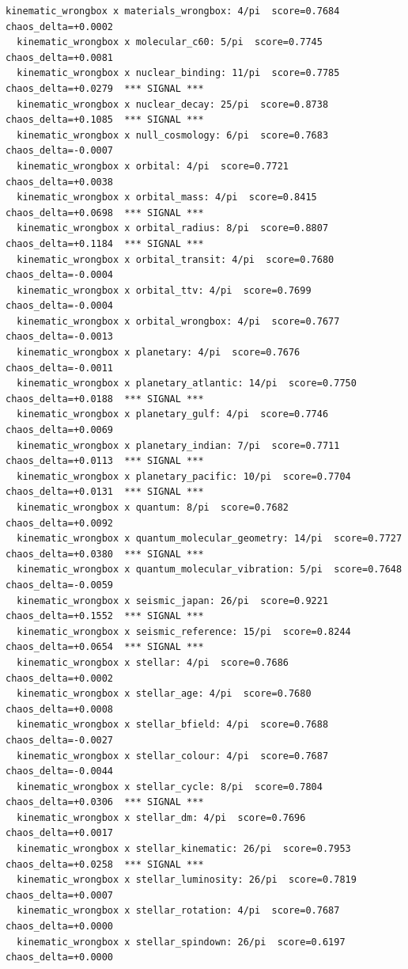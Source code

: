 \documentclass[11pt, letterpaper, openany]{book}
\begin{document}
\begin{empiricalbox}
\begin{lstlisting}[style=terminal]
  kinematic_wrongbox x materials_wrongbox: 4/pi  score=0.7684  chaos_delta=+0.0002
  kinematic_wrongbox x molecular_c60: 5/pi  score=0.7745  chaos_delta=+0.0081
  kinematic_wrongbox x nuclear_binding: 11/pi  score=0.7785  chaos_delta=+0.0279  *** SIGNAL ***
  kinematic_wrongbox x nuclear_decay: 25/pi  score=0.8738  chaos_delta=+0.1085  *** SIGNAL ***
  kinematic_wrongbox x null_cosmology: 6/pi  score=0.7683  chaos_delta=-0.0007
  kinematic_wrongbox x orbital: 4/pi  score=0.7721  chaos_delta=+0.0038
  kinematic_wrongbox x orbital_mass: 4/pi  score=0.8415  chaos_delta=+0.0698  *** SIGNAL ***
  kinematic_wrongbox x orbital_radius: 8/pi  score=0.8807  chaos_delta=+0.1184  *** SIGNAL ***
  kinematic_wrongbox x orbital_transit: 4/pi  score=0.7680  chaos_delta=-0.0004
  kinematic_wrongbox x orbital_ttv: 4/pi  score=0.7699  chaos_delta=-0.0004
  kinematic_wrongbox x orbital_wrongbox: 4/pi  score=0.7677  chaos_delta=-0.0013
  kinematic_wrongbox x planetary: 4/pi  score=0.7676  chaos_delta=-0.0011
  kinematic_wrongbox x planetary_atlantic: 14/pi  score=0.7750  chaos_delta=+0.0188  *** SIGNAL ***
  kinematic_wrongbox x planetary_gulf: 4/pi  score=0.7746  chaos_delta=+0.0069
  kinematic_wrongbox x planetary_indian: 7/pi  score=0.7711  chaos_delta=+0.0113  *** SIGNAL ***
  kinematic_wrongbox x planetary_pacific: 10/pi  score=0.7704  chaos_delta=+0.0131  *** SIGNAL ***
  kinematic_wrongbox x quantum: 8/pi  score=0.7682  chaos_delta=+0.0092
  kinematic_wrongbox x quantum_molecular_geometry: 14/pi  score=0.7727  chaos_delta=+0.0380  *** SIGNAL ***
  kinematic_wrongbox x quantum_molecular_vibration: 5/pi  score=0.7648  chaos_delta=-0.0059
  kinematic_wrongbox x seismic_japan: 26/pi  score=0.9221  chaos_delta=+0.1552  *** SIGNAL ***
  kinematic_wrongbox x seismic_reference: 15/pi  score=0.8244  chaos_delta=+0.0654  *** SIGNAL ***
  kinematic_wrongbox x stellar: 4/pi  score=0.7686  chaos_delta=+0.0002
  kinematic_wrongbox x stellar_age: 4/pi  score=0.7680  chaos_delta=+0.0008
  kinematic_wrongbox x stellar_bfield: 4/pi  score=0.7688  chaos_delta=-0.0027
  kinematic_wrongbox x stellar_colour: 4/pi  score=0.7687  chaos_delta=-0.0044
  kinematic_wrongbox x stellar_cycle: 8/pi  score=0.7804  chaos_delta=+0.0306  *** SIGNAL ***
  kinematic_wrongbox x stellar_dm: 4/pi  score=0.7696  chaos_delta=+0.0017
  kinematic_wrongbox x stellar_kinematic: 26/pi  score=0.7953  chaos_delta=+0.0258  *** SIGNAL ***
  kinematic_wrongbox x stellar_luminosity: 26/pi  score=0.7819  chaos_delta=+0.0007
  kinematic_wrongbox x stellar_rotation: 4/pi  score=0.7687  chaos_delta=+0.0000
  kinematic_wrongbox x stellar_spindown: 26/pi  score=0.6197  chaos_delta=+0.0000

\end{lstlisting}
\end{empiricalbox}
\end{document}

